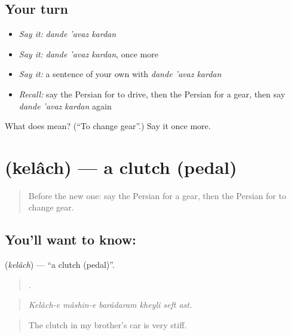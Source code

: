 \subsection*{Your turn}
\begin{itemize}
\raggedright
  \item \emph{Say it:} \emph{dande 'avaz kardan}
  \item \emph{Say it:} \emph{dande 'avaz kardan}, once more
  \item \emph{Say it:} a sentence of your own with \emph{dande 'avaz kardan}
  \item \emph{Recall:} say the Persian for to drive, then the Persian for a gear, then say \emph{dande 'avaz kardan} again
\end{itemize}

\begin{tcolorbox}[breakable,colback=teal!4,colframe=teal!35!black,title={Before you move on}]
What does    mean? (\textquotedblleft{}To change gear\textquotedblright{}.) Say it once more.
\end{tcolorbox}
\section[\texorpdfstring{\fa{کلاچ} (kelâch)}{کلاچ (kelâch)}]{ (kelâch) — a clutch (pedal)}

\label{lesson:FA-C420-kelach}



\begin{quote}
Before the new one: say the Persian for a gear, then the Persian for to change gear.
\end{quote}

\subsection*{You'll want to know: }
\textbf{} (\emph{kelâch}) — \textquotedblleft{}a clutch (pedal)\textquotedblright{}.

\begin{quote}
     .
\end{quote}

\begin{quote}
\emph{Kelâch-e mâshin-e barâdaram kheyli seft ast.}
\end{quote}

\begin{quote}
The clutch in my brother's car is very stiff.
\end{quote}

